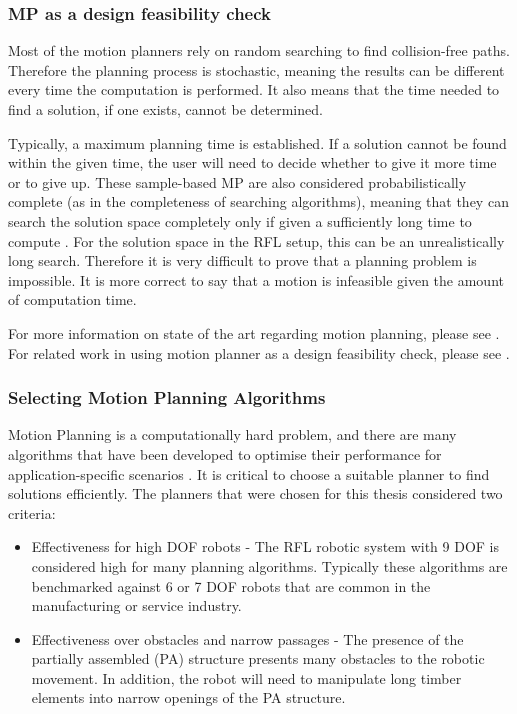 \subsubsection{MP as a design feasibility check}
\label{subsubsection:exploration-2-mp-as-a-design-feasibility-check}

Most of the motion planners rely on random searching to find collision-free paths. Therefore the planning process is stochastic, meaning the results can be different every time the computation is performed. It also means that the time needed to find a solution, if one exists, cannot be determined. 

Typically, a maximum planning time is established. If a solution cannot be found within the given time, the user will need to decide whether to give it more time or to give up. These sample-based MP are also considered probabilistically complete (as in the completeness of searching algorithms), meaning that they can search the solution space completely only if given a sufficiently long time to compute \parencite{lavallePlanningAlgorithms2006}. For the solution space in the RFL setup, this can be an unrealistically long search. Therefore it is very difficult to prove that a planning problem is impossible. It is more correct to say that a motion is infeasible given the amount of computation time.

For more information on state of the art regarding motion planning, please see \parencite{garrettIntegratedTaskMotion2021a}. For related work in using motion planner as a design feasibility check, please see \parencite{gandiaAutomaticPathPlanning2018}. 

\subsubsection{Selecting Motion Planning Algorithms}
\label{subsubsection:exploration-2-selecting-motion-planning-algorithms}

Motion Planning is a computationally hard problem, and there are many algorithms that have been developed to optimise their performance for application-specific scenarios \parencite{lavallePlanningAlgorithms2006}. It is critical to choose a suitable planner to find solutions efficiently. The planners that were chosen for this thesis considered two criteria:
\begin{itemize}
    \item Effectiveness for high DOF robots - The RFL robotic system with 9 DOF is considered high for many planning algorithms. Typically these algorithms are benchmarked against 6 or 7 DOF robots that are common in the manufacturing or service industry.
    \item Effectiveness over obstacles and narrow passages - The presence of the partially assembled (PA) structure presents many obstacles to the robotic movement. In addition, the robot will need to manipulate long timber elements into narrow openings of the PA structure.
\end{itemize}

